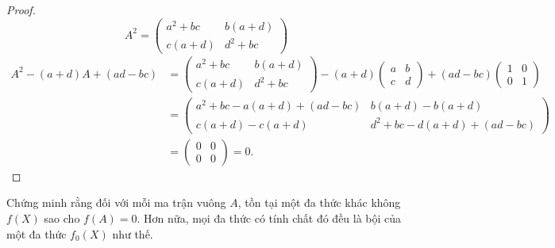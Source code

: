 \begin{proof}
    \[
        A^{2} =
        \begin{pmatrix}
            a^{2}+bc & b(a+d)   \\
            c(a+d)   & d^{2}+bc
        \end{pmatrix}
    \]
    \begin{align*}
        A^{2} - (a+d)A + (ad-bc) & = \begin{pmatrix}a^{2}+bc & b(a+d) \\ c(a+d) & d^{2}+bc\end{pmatrix} - (a+d)\begin{pmatrix}a & b \\ c & d\end{pmatrix} + (ad-bc)\begin{pmatrix}1 & 0 \\ 0 & 1\end{pmatrix} \\
                                 & = \begin{pmatrix}a^{2}+bc - a(a+d) + (ad-bc) & b(a+d) - b(a+d) \\ c(a+d) - c(a+d) & d^{2}+bc - d(a+d) + (ad-bc)\end{pmatrix}                                               \\
                                 & = \begin{pmatrix}0 & 0 \\ 0 & 0 \end{pmatrix} = 0.
    \end{align*}
\end{proof}

\begin{exercise}\label{minimal-poly}
    Chứng minh rằng đối với mỗi ma trận vuông $A$, tồn tại một đa thức khác không $f(X)$ sao cho $f(A) = 0$. Hơn nữa, mọi đa thức có tính chất đó đều là bội của một đa thức $f_{0}(X)$ như thế.
\end{exercise}

